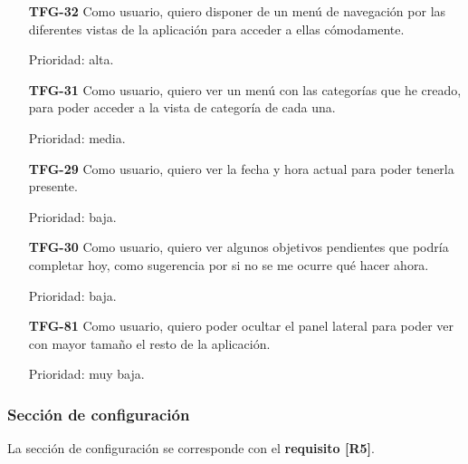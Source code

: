 \documentclass[10pt, a4paper]{aqademic}
\begin{document}
\begin{itemize}[leftmargin=16mm]
	\item [\textbf{TFG-32}] Como usuario, quiero disponer de un menú de navegación por las diferentes vistas de la aplicación para acceder a ellas cómodamente.
	
	Prioridad: alta.
	
	\item [\textbf{TFG-31}] Como usuario, quiero ver un menú con las categorías que he creado, para poder acceder a la vista de categoría de cada una.
	
	Prioridad: media.
	
	\item [\textbf{TFG-29}] Como usuario, quiero ver la fecha y hora actual para poder tenerla presente.
	
	Prioridad: baja.
	
	\item [\textbf{TFG-30}] Como usuario, quiero ver algunos objetivos pendientes que podría completar hoy, como sugerencia por si no se me ocurre qué hacer ahora.
	
	Prioridad: baja.
	
	\item [\textbf{TFG-81}] Como usuario, quiero poder ocultar el panel lateral para poder ver con mayor tamaño el resto de la aplicación.
	
	Prioridad: muy baja.
\end{itemize}

\subsubsection*{Sección de configuración}

La sección de configuración se corresponde con el \textbf{requisito [R5]}.
\end{document}
